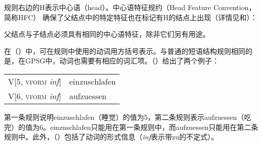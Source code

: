 规则右边的H表示中心语（head）。中心语特征规约（Head Feature Convention，简称HFC） 确保了父结点中的特定特征也在标记有H的结点上出现（详情见\citealp*[第5.4节]{GKPS85a}和\citealp[67]{Uszkoreit87a}）：
\begin{principle-break}[中心语特征规约]
父结点与子结点必须具有相同的中心语特征，除非它们另有用途。
\end{principle-break}
在（）中，可在规则中使用的动词用方括号表示。与普通的短语结构规则相同的是，在GPSG中，动词也需要有相应的词汇项。（）给出了两个例子：
\ea
\begin{tabular}[t]{@{}l@{~$\to$~}l@{}}
V[5, \textsc{vform} \emph{inf}]  & einzuschlafen\\
V[6, \textsc{vform} \emph{inf}]  & aufzuessen\\
\end{tabular}
\z
第一条规则说明einzuschlafen（睡觉）的\subcatc 值为5，第二条规则表示aufzuessen（吃完）的\subcatc 值为6。einzuschlafen只能用在第一条规则中，而aufzuessen只能用在第二条规则中。此外，（）包括了动词的形式信息（\emph{inf}表示带zu的不定式）。

